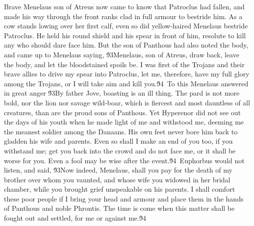 {  Brave Menelaus son of Atreus now came to know that Patroclus had fallen, and made his way through the front ranks clad in full armour to bestride him. As a cow stands lowing over her first calf, even so did yellow-haired Menelaus bestride Patroclus. He held his round shield and his spear in front of him, resolute to kill any who should dare face him. But the son of Panthous had also noted the body, and came up to Menelaus saying, \'93Menelaus, son of Atreus, draw back, leave the body, and let the bloodstained spoils be. I was first of the Trojans and their brave allies to drive my spear into Patroclus, let me, therefore, have my full glory among the Trojans, or I will take aim and kill you.\'94\
To this Menelaus answered in great anger \'93By father Jove, boasting is an ill thing. The pard is not more bold, nor the lion nor savage wild-boar, which is fiercest and most dauntless of all creatures, than are the proud sons of Panthous. Yet Hyperenor did not see out the days of his youth when he made light of me and withstood me, deeming me the meanest soldier among the Danaans. His own feet never bore him back to gladden his wife and parents. Even so shall I make an end of you too, if you withstand me; get you back into the crowd and do not face me, or it shall be worse for you. Even a fool may be wise after the event.\'94\
Euphorbus would not listen, and said, \'93Now indeed, Menelaus, shall you pay for the death of my brother over whom you vaunted, and whose wife you widowed in her bridal chamber, while you brought grief unspeakable on his parents. I shall comfort these poor people if I bring your head and armour and place them in the hands of Panthous and noble Phrontis. The time is come when this matter shall be fought out and settled, for me or against me.\'94\
}
